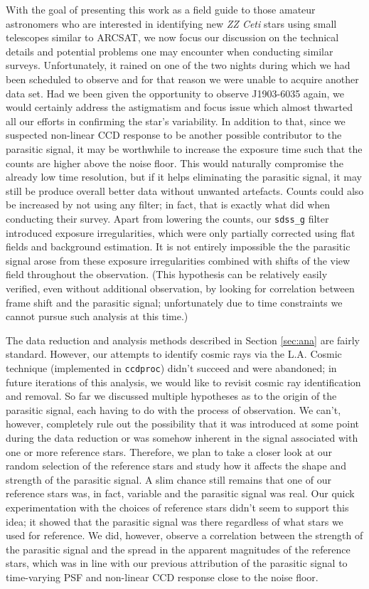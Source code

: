 \documentclass{aastex631}
\begin{document}
With the goal of presenting this work as a field guide to those
amateur astronomers who are interested in identifying new \emph{ZZ
Ceti} stars using small telescopes similar to ARCSAT, we now focus our
discussion on the technical details and potential problems one may
encounter when conducting similar surveys. Unfortunately, it rained on
one of the two nights during which we had been scheduled to observe
and for that reason we were unable to acquire another data set. Had we
been given the opportunity to observe J1903-6035 again, we would
certainly address the astigmatism and focus issue which almost
thwarted all our efforts in confirming the star's variability. In
addition to that, since we suspected non-linear CCD response to be
another possible contributor to the parasitic signal, it may be
worthwhile to increase the exposure time such that the counts are
higher above the noise floor. This would naturally compromise the
already low time resolution, but if it helps eliminating the parasitic
signal, it may still be produce overall better data without unwanted
artefacts. Counts could also be increased by not using any filter; in
fact, that is exactly what \citep{Vincent_2020} did when conducting
their survey. Apart from lowering the counts, our \texttt{sdss\_g}
filter introduced exposure irregularities, which were only partially
corrected using flat fields and background estimation. It is not
entirely impossible the the parasitic signal arose from these exposure
irregularities combined with shifts of the view field throughout the
observation. (This hypothesis can be relatively easily verified, even
without additional observation, by looking for correlation between
frame shift and the parasitic signal; unfortunately due to time
constraints we cannot pursue such analysis at this time.)

The data reduction and analysis methods described in Section
\ref{sec:ana} are fairly standard. However, our attempts to identify
cosmic rays via the L.A. Cosmic technique (implemented in
\texttt{ccdproc}) didn't succeed and were abandoned; in future
iterations of this analysis, we would like to revisit cosmic ray
identification and removal. So far we discussed multiple hypotheses as
to the origin of the parasitic signal, each having to do with the
process of observation. We can't, however, completely rule out the
possibility that it was introduced at some point during the data
reduction or was somehow inherent in the signal associated with one or
more reference stars. Therefore, we plan to take a closer look at our
random selection of the reference stars and study how it affects the
shape and strength of the parasitic signal. A slim chance still
remains that one of our reference stars was, in fact, variable and the
parasitic signal was real. Our quick experimentation with the choices
of reference stars didn't seem to support this idea; it showed that
the parasitic signal was there regardless of what stars we used for
reference. We did, however, observe a correlation between the strength
of the parasitic signal and the spread in the apparent magnitudes of
the reference stars, which was in line with our previous attribution
of the parasitic signal to time-varying PSF and non-linear CCD
response close to the noise floor.
\end{document}
